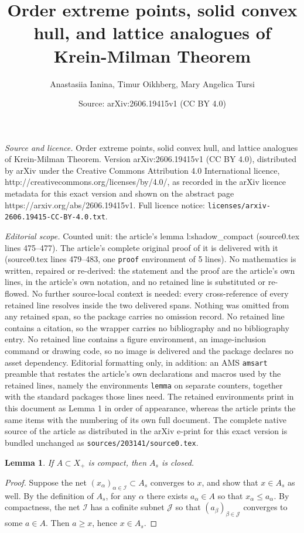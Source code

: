 \documentclass[10pt,a4paper]{amsart}
\title{Order extreme points, solid convex hull, and lattice analogues of Krein-Milman Theorem}
\author{Anastasiia Ianina, Timur Oikhberg, Mary Angelica Tursi}
\date{Source: arXiv:2606.19415v1 (CC BY 4.0)}
\newtheorem{lemma}{Lemma}
\begin{document}
\maketitle

\noindent\emph{Source and licence.} Order extreme points, solid convex hull, and lattice analogues of Krein-Milman Theorem. Version arXiv:2606.19415v1 (CC BY 4.0), distributed by arXiv under the Creative Commons Attribution 4.0 International licence, http://creativecommons.org/licenses/by/4.0/, as recorded in the arXiv licence metadata for this exact version and shown on the abstract page https://arxiv.org/abs/2606.19415v1. Full licence notice: \texttt{licenses/arxiv-2606.19415-CC-BY-4.0.txt}.\par\smallskip

\noindent\textit{Editorial scope.} Counted unit: the article's lemma l:shadow\_compact (source0.tex lines 475--477). The article's complete original proof of it is delivered with it (source0.tex lines 479--483, one \texttt{proof} environment of 5 lines). No mathematics is written, repaired or re-derived: the statement and the proof are the article's own lines, in the article's own notation, and no retained line is substituted or re-flowed.  No further source-local context is needed: every cross-reference of every retained line resolves inside the two delivered spans.  Nothing was omitted from any retained span, so the package carries no omission record.  No retained line contains a citation, so the wrapper carries no bibliography and no bibliography entry.  No retained line contains a figure environment, an image-inclusion command or drawing code, so no image is delivered and the package declares no asset dependency.  Editorial formatting only, in addition: an AMS \texttt{amsart} preamble that restates the article's own declarations and macros used by the retained lines, namely the environments \texttt{lemma} on separate counters, together with the standard packages those lines need.  The retained environments print in this document as Lemma 1 in order of appearance, whereas the article prints the same items with the numbering of its own full document.  The complete native source of the article as distributed in the arXiv e-print for this exact version is bundled unchanged as \texttt{sources/203141/source0.tex}.
\begin{lemma}\label{l:shadow_compact}
If $A \subset X_+$ is compact, then $A_s$ is closed.
\end{lemma}

\begin{proof}
Suppose the net $(x_\alpha)_{\alpha \in {\mathcal{I}}} \subset A_s$ converges to $x$, and show that $x \in A_s$ as well.
By the definition of $A_s$, for any $\alpha$ there exists $a_\alpha \in A$ so that $x_\alpha \leq a_\alpha$.
By compactness, the net ${\mathcal{I}}$ has a cofinite subnet ${\mathcal{J}}$ so that $(a_\beta)_{\beta \in {\mathcal{J}}}$ converges to some $a \in A$. Then $a \geq x$, hence $x \in A_s$. 
\end{proof}
\end{document}
